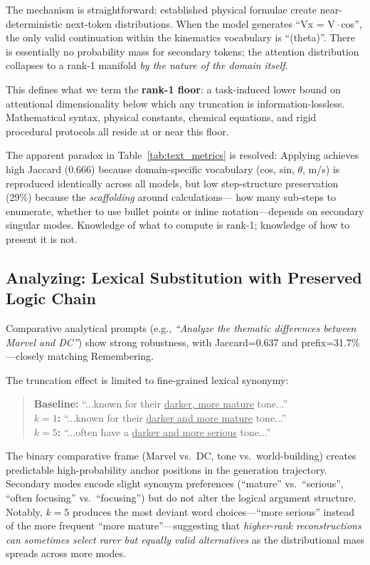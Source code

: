 The mechanism is straightforward: established physical formulae create near-deterministic next-token
distributions.
When the model generates ``Vx = V\,$\cdot$\,cos'', the only valid continuation within the kinematics
vocabulary is ``(theta)''.
There is essentially no probability mass for secondary tokens; the attention distribution collapses
to a rank-1 manifold \textit{by the nature of the domain itself}.

This defines what we term the \textbf{rank-1 floor}: a task-induced lower bound on attentional
dimensionality below which any truncation is information-lossless.
Mathematical syntax, physical constants, chemical equations, and rigid procedural protocols all reside
at or near this floor.

The apparent paradox in Table~\ref{tab:text_metrics} is resolved: Applying achieves high Jaccard (0.666)
because domain-specific vocabulary (cos, sin, $\theta$, m/s) is reproduced identically across all models,
but low step-structure preservation (29\%) because the \textit{scaffolding} around calculations---
how many sub-steps to enumerate, whether to use bullet points or inline notation---depends on
secondary singular modes.
Knowledge of what to compute is rank-1; knowledge of how to present it is not.

\subsection{Analyzing: Lexical Substitution with Preserved Logic Chain}

Comparative analytical prompts (e.g., \textit{``Analyze the thematic differences between Marvel and DC''})
show strong robustness, with Jaccard=0.637 and prefix=31.7\%---closely matching Remembering.

The truncation effect is limited to fine-grained lexical synonymy:

\begin{quote}
\small
\textbf{Baseline:} ``...known for their \underline{darker, more mature} tone...''\\
\textbf{$k=1$:}  ``...known for their \underline{darker and more mature} tone...''\\
\textbf{$k=5$:}  ``...often have a \underline{darker and more serious} tone...''
\end{quote}

The binary comparative frame (Marvel vs.\ DC, tone vs.\ world-building) creates
predictable high-probability anchor positions in the generation trajectory.
Secondary modes encode slight synonym preferences (``mature'' vs.\ ``serious'',
``often focusing'' vs.\ ``focusing'') but do not alter the logical argument structure.
Notably, $k=5$ produces the most deviant word choices---``more serious''
instead of the more frequent ``more mature''---suggesting that \emph{higher-rank
reconstructions can sometimes select rarer but equally valid alternatives}
as the distributional mass spreads across more modes.

